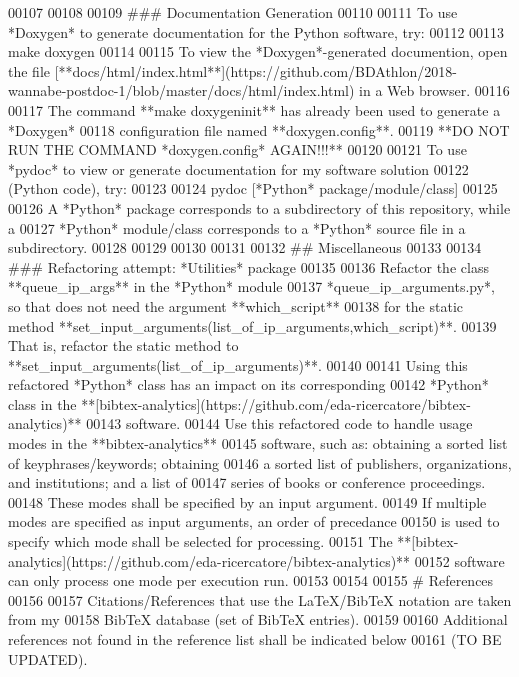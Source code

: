 \begin{DoxyCode}
00107 
00108 
00109 ###    Documentation Generation
00110 
00111 To use *Doxygen* to generate documentation for the Python software, try:
00112 
00113    make doxygen
00114 
00115 To view the *Doxygen*-generated documention, open the file
       [**docs/html/index.html**](https://github.com/BDAthlon/2018-wannabe-postdoc-1/blob/master/docs/html/index.html) in a Web browser.
00116 
00117 The command **make doxygeninit** has already been used to generate a *Doxygen*
00118    configuration file named **doxygen.config**.
00119    **DO NOT RUN THE COMMAND *doxygen.config* AGAIN!!!**
00120 
00121 To use *pydoc* to view or generate documentation for my software solution
00122    (Python code), try:
00123 
00124    pydoc [*Python* package/module/class]
00125 
00126 A *Python* package corresponds to a subdirectory of this repository, while a
00127    *Python* module/class corresponds to a *Python* source file in a subdirectory.
00128 
00129 
00130 
00131 
00132 ## Miscellaneous
00133 
00134 ###    Refactoring attempt: *Utilities* package
00135 
00136 Refactor the class **queue\_ip\_args** in the *Python* module
00137    *queue\_ip\_arguments.py*, so that does not need the argument **which\_script**
00138    for the static method **set\_input\_arguments(list\_of\_ip\_arguments,which\_script)**.
00139    That is, refactor the static method to **set\_input\_arguments(list\_of\_ip\_arguments)**.
00140 
00141 Using this refactored *Python* class has an impact on its corresponding
00142    *Python* class in the **[bibtex-analytics](https://github.com/eda-ricercatore/bibtex-analytics)**
00143    software.
00144    Use this refactored code to handle usage modes in the **bibtex-analytics**
00145        software, such as: obtaining a sorted list of keyphrases/keywords; obtaining
00146        a sorted list of publishers, organizations, and institutions; and a list of
00147        series of books or conference proceedings.
00148    These modes shall be specified by an input argument.
00149    If multiple modes are specified as input arguments, an order of precedance
00150        is used to specify which mode shall be selected for processing.
00151    The **[bibtex-analytics](https://github.com/eda-ricercatore/bibtex-analytics)**
00152        software can only process one mode per execution run.
00153 
00154 
00155 #  References
00156 
00157 Citations/References that use the LaTeX/BibTeX notation are taken from my
00158    BibTeX database (set of BibTeX entries).
00159 
00160 Additional references not found in the reference list shall be indicated below
00161    (TO BE UPDATED).

\end{DoxyCode}
